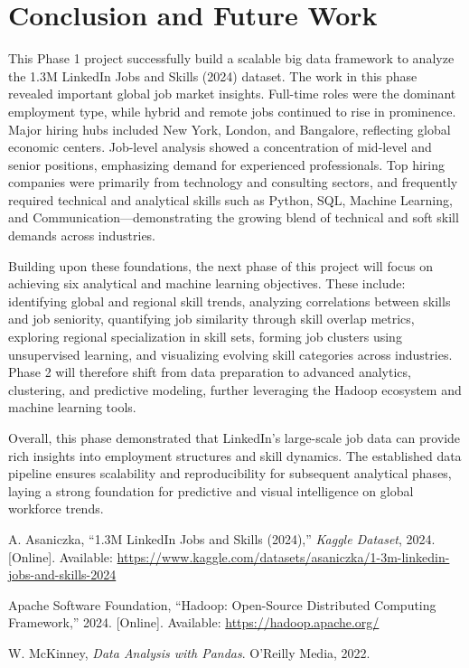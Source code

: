 \documentclass[conference]{IEEEtran}
\begin{document}
\section{\textbf{Conclusion and Future Work}}
This Phase 1 project successfully build a scalable big data framework to analyze the 1.3M LinkedIn Jobs and Skills (2024) dataset. The work in this phase revealed important global job market insights. Full-time roles were the dominant employment type, while hybrid and remote jobs continued to rise in prominence. Major hiring hubs included New York, London, and Bangalore, reflecting global economic centers. Job-level analysis showed a concentration of mid-level and senior positions, emphasizing demand for experienced professionals. Top hiring companies were primarily from technology and consulting sectors, and frequently required technical and analytical skills such as Python, SQL, Machine Learning, and Communication—demonstrating the growing blend of technical and soft skill demands across industries.  

Building upon these foundations, the next phase of this project will focus on achieving six analytical and machine learning objectives. These include: identifying global and regional skill trends, analyzing correlations between skills and job seniority, quantifying job similarity through skill overlap metrics, exploring regional specialization in skill sets, forming job clusters using unsupervised learning, and visualizing evolving skill categories across industries. Phase 2 will therefore shift from data preparation to advanced analytics, clustering, and predictive modeling, further leveraging the Hadoop ecosystem and machine learning tools.  

Overall, this phase demonstrated that LinkedIn’s large-scale job data can provide rich insights into employment structures and skill dynamics. The established data pipeline ensures scalability and reproducibility for subsequent analytical phases, laying a strong foundation for predictive and visual intelligence on global workforce trends.



\begin{thebibliography}{00}

A. Asaniczka, “1.3M LinkedIn Jobs and Skills (2024),” \textit{Kaggle Dataset}, 2024. [Online]. Available: \url{https://www.kaggle.com/datasets/asaniczka/1-3m-linkedin-jobs-and-skills-2024}

Apache Software Foundation, “Hadoop: Open-Source Distributed Computing Framework,” 2024. [Online]. Available: \url{https://hadoop.apache.org/}

W. McKinney, \textit{Data Analysis with Pandas}. O’Reilly Media, 2022.



\end{thebibliography}
\end{document}

